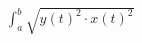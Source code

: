 \documentclass[preview]{standalone}
\begin{document}
\begin{align*}
\int_{a}^{b} \sqrt{y(t)^2 \cdot x(t)^2}
\end{align*}
\end{document}
